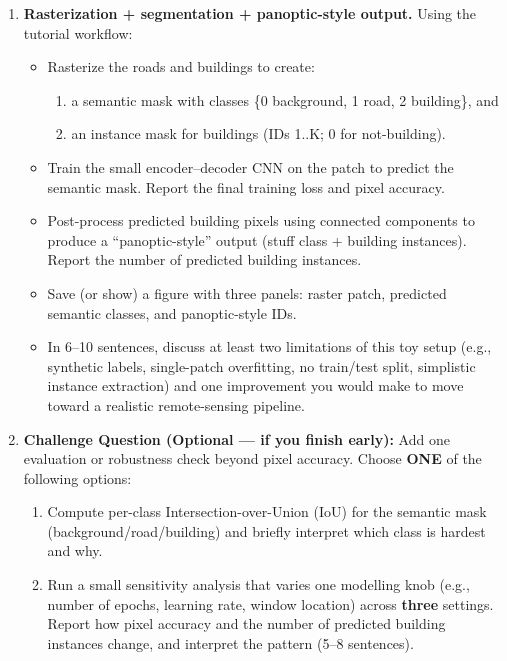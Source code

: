 \documentclass[11pt]{article}
\begin{document}
\begin{enumerate}
\item \textbf{Rasterization + segmentation + panoptic-style output.}
Using the tutorial workflow:
\begin{itemize}
  \item Rasterize the roads and buildings to create:
  \begin{enumerate}
    \item a semantic mask with classes \{0 background, 1 road, 2 building\}, and
    \item an instance mask for buildings (IDs 1..K; 0 for not-building).
  \end{enumerate}
  \item Train the small encoder--decoder CNN on the patch to predict the semantic mask. Report the final training loss and pixel accuracy.
  \item Post-process predicted building pixels using connected components to produce a ``panoptic-style'' output (stuff class + building instances). Report the number of predicted building instances.
  \item Save (or show) a figure with three panels: raster patch, predicted semantic classes, and panoptic-style IDs.
  \item In 6--10 sentences, discuss at least two limitations of this toy setup (e.g., synthetic labels, single-patch overfitting, no train/test split, simplistic instance extraction) and one improvement you would make to move toward a realistic remote-sensing pipeline.
\end{itemize}

\item \textbf{Challenge Question (Optional --- if you finish early):}
Add one evaluation or robustness check beyond pixel accuracy.
Choose \textbf{ONE} of the following options:
\begin{enumerate}
  \item Compute per-class Intersection-over-Union (IoU) for the semantic mask (background/road/building) and briefly interpret which class is hardest and why.
  \item Run a small sensitivity analysis that varies one modelling knob (e.g., number of epochs, learning rate, window location) across \textbf{three} settings. Report how pixel accuracy and the number of predicted building instances change, and interpret the pattern (5--8 sentences).
\end{enumerate}

\end{enumerate}
\end{document}
